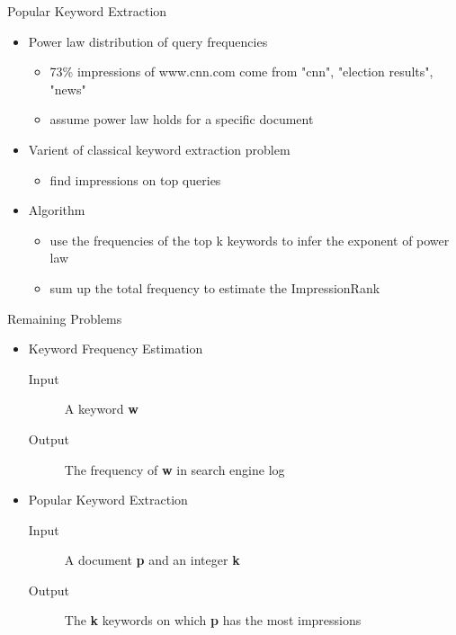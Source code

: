 \documentclass{beamer}
\newcommand{\page}{\textbf{p} }
\newcommand{\keyword}{\textbf{w} }
\begin{document}
    \begin{frame}{Popular Keyword Extraction}
        \begin{itemize}
        \item Power law distribution of query frequencies
            \begin{itemize}
            \item 73\% impressions of www.cnn.com come from "cnn", "election results", "news"
            \item assume power law holds for a specific document
            \end{itemize}
        \item Varient of classical keyword extraction problem
            \begin{itemize}
            \item find impressions on top queries
            \end{itemize}
        \item Algorithm
            \begin{itemize}
            \item use the frequencies of the top k keywords to infer the exponent of power law
            \item sum up the total frequency to estimate the ImpressionRank
            \end{itemize}
        \end{itemize}
    \end{frame}

    \begin{frame}{Remaining Problems}
        \begin{itemize}
        \item Keyword Frequency Estimation
            \begin{description}
            \item [Input] A keyword \keyword
            \item [Output] The frequency of \keyword in search engine log
            \end{description}
        \item Popular Keyword Extraction
            \begin{description}
            \item [Input] A document \page and an integer \textbf{k}
            \item [Output] The \textbf{k} keywords on which \page has the most impressions
            \end{description}
        \end{itemize}
    \end{frame}
\end{document}
